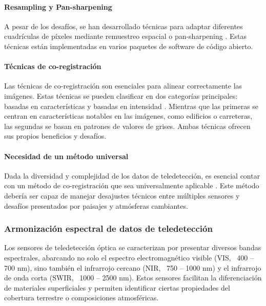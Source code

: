                 \paragraph{Resampling y Pan-sharpening}
                    A pesar de los desafíos, se han desarrollado técnicas para adaptar diferentes cuadrículas de píxeles mediante remuestreo espacial o pan-sharpening \autocite{ghassemian2016review, javan2021review, li2017pixel}. Estas técnicas están implementadas en varios paquetes de software de código abierto.
                    
                \paragraph{Técnicas de co-registración}
                    Las técnicas de co-registración son esenciales para alinear correctamente las imágenes. Estas técnicas se pueden clasificar en dos categorías principales: basadas en características y basadas en intensidad \autocite{zitova2003image}. Mientras que las primeras se centran en características notables en las imágenes, como edificios o carreteras, las segundas se basan en patrones de valores de grises. Ambas técnicas ofrecen sus propios beneficios y desafíos. 
                    
                \paragraph{Necesidad de un método universal}
                    Dada la diversidad y complejidad de los datos de teledetección, es esencial contar con un método de co-registración que sea universalmente aplicable \autocite{chen2003mutual}. Este método debería ser capaz de manejar desajustes técnicos entre múltiples sensores y desafíos presentados por paisajes y atmósferas cambiantes.

            \subsubsection{Armonización espectral de datos de teledetección}
                Los sensores de teledetección óptica se caracterizan por presentar diversos bandas espectrales, abarcando no solo el espectro electromagnético visible (VIS, ~400 – 700 nm), sino también el infrarrojo cercano (NIR, ~750 – 1000 nm) y el infrarrojo de onda corta (SWIR, ~1000 – 2500 nm). Estos sensores facilitan la diferenciación de materiales superficiales y permiten identificar ciertas propiedades del cobertura terrestre o composiciones atmosféricas.
                
